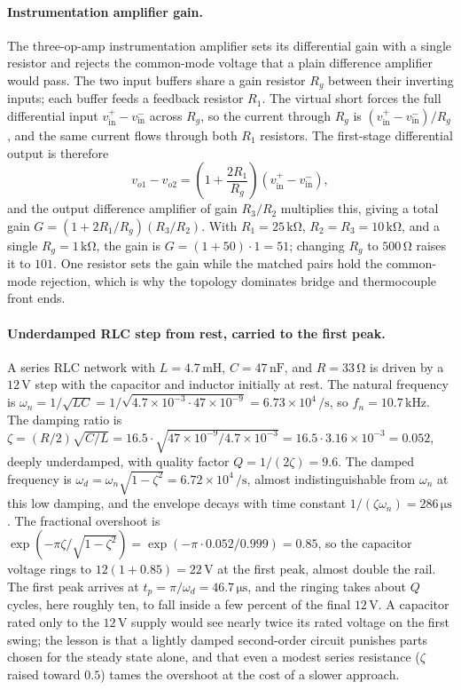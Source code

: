 \paragraph{Instrumentation amplifier gain.}
The three-op-amp instrumentation amplifier sets its differential gain
with a single resistor and rejects the common-mode voltage that a plain
difference amplifier would pass. The two input buffers share a gain
resistor $R_{g}$ between their inverting inputs; each buffer feeds a
feedback resistor $R_{1}$. The virtual short forces the full
differential input $v_{\text{in}}^{+}-v_{\text{in}}^{-}$ across $R_{g}$,
so the current through $R_{g}$ is $(v_{\text{in}}^{+}-v_{\text{in}}^{-})/
R_{g}$, and the same current flows through both $R_{1}$ resistors. The
first-stage differential output is therefore
\[
v_{o1}-v_{o2} = \left(1+\frac{2R_{1}}{R_{g}}\right)
\left(v_{\text{in}}^{+}-v_{\text{in}}^{-}\right),
\]
and the output difference amplifier of gain $R_{3}/R_{2}$ multiplies
this, giving a total gain $G = (1+2R_{1}/R_{g})(R_{3}/R_{2})$. With
$R_{1} = 25\,\si{\kilo\ohm}$, $R_{2} = R_{3} = 10\,\si{\kilo\ohm}$, and a
single $R_{g} = 1\,\si{\kilo\ohm}$, the gain is $G = (1+50)\cdot 1 = 51$;
changing $R_{g}$ to $500\,\si{\ohm}$ raises it to $101$. One resistor
sets the gain while the matched pairs hold the common-mode rejection,
which is why the topology dominates bridge and thermocouple front ends.

\paragraph{Underdamped RLC step from rest, carried to the first peak.}
A series RLC network with $L = 4.7\,\si{\milli\henry}$, $C = 47\,\si{\nano
\farad}$, and $R = 33\,\si{\ohm}$ is driven by a $12\,\si{\volt}$ step with
the capacitor and inductor initially at rest. The natural frequency is
$\omega_{n} = 1/\sqrt{LC} = 1/\sqrt{4.7\times 10^{-3}\cdot 47\times 10^{-9}}
= 6.73\times 10^{4}\,\si{\per\second}$, so $f_{n} = 10.7\,\si{\kilo\hertz}$.
The damping ratio is $\zeta = (R/2)\sqrt{C/L} = 16.5\cdot\sqrt{47\times
10^{-9}/4.7\times 10^{-3}} = 16.5\cdot 3.16\times 10^{-3} = 0.052$, deeply
underdamped, with quality factor $Q = 1/(2\zeta) = 9.6$. The damped frequency
is $\omega_{d} = \omega_{n}\sqrt{1-\zeta^{2}} = 6.72\times 10^{4}\,\si{\per
\second}$, almost indistinguishable from $\omega_{n}$ at this low damping,
and the envelope decays with time constant $1/(\zeta\omega_{n}) = 286\,\si{
\micro\second}$. The fractional overshoot is $\exp(-\pi\zeta/\sqrt{1-\zeta^{2}})
= \exp(-\pi\cdot 0.052/0.999) = 0.85$, so the capacitor voltage rings to
$12(1+0.85) = 22\,\si{\volt}$ at the first peak, almost double the rail. The
first peak arrives at $t_{p} = \pi/\omega_{d} = 46.7\,\si{\micro\second}$, and
the ringing takes about $Q$ cycles, here roughly ten, to fall inside a few
percent of the final $12\,\si{\volt}$. A capacitor rated only to the
$12\,\si{\volt}$ supply would see nearly twice its rated voltage on the first
swing; the lesson is that a lightly damped second-order circuit punishes
parts chosen for the steady state alone, and that even a modest series
resistance ($\zeta$ raised toward $0.5$) tames the overshoot at the cost of a
slower approach.

